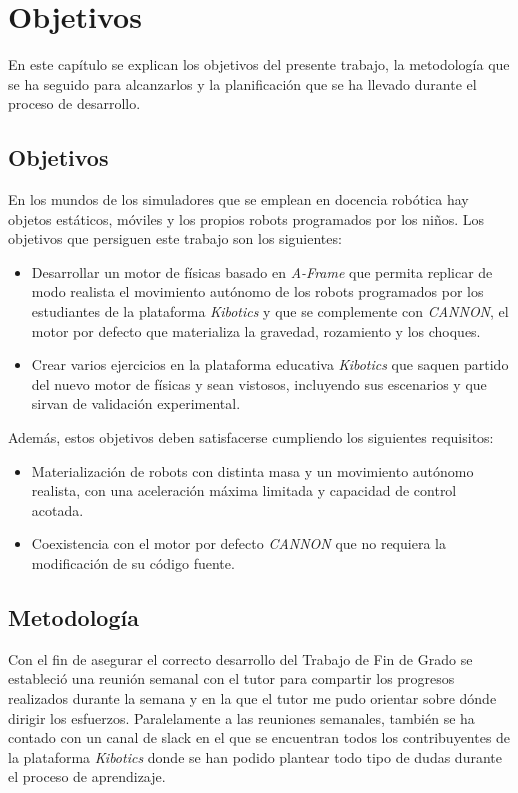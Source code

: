\chapter{Objetivos}
\label{chap:objetivos} 
En este capítulo se explican los objetivos del presente trabajo, la metodología que se ha seguido para alcanzarlos y la planificación que se ha llevado durante el proceso de desarrollo.
   
\section{Objetivos}
En los mundos de los simuladores que se emplean en docencia robótica hay objetos estáticos, móviles y los propios robots programados por los niños. Los objetivos que persiguen este trabajo son los siguientes:

\begin{itemize}
    \item Desarrollar un motor de físicas basado en \textit{A-Frame} que permita replicar de modo realista el movimiento autónomo de los robots programados por los estudiantes de la plataforma \textit{Kibotics} y que se complemente con \textit{CANNON}, el motor por defecto que materializa la gravedad, rozamiento y los choques.
    \item Crear varios ejercicios en la plataforma educativa \textit{Kibotics} que saquen partido del nuevo motor de físicas y sean vistosos, incluyendo sus escenarios y que sirvan de validación experimental.
\end{itemize}

Además, estos objetivos deben satisfacerse cumpliendo los siguientes requisitos:

\begin{itemize}
    \item Materialización de robots con distinta masa y un movimiento autónomo realista, con una aceleración máxima limitada y capacidad de control acotada.
    \item Coexistencia con el motor por defecto \textit{CANNON} que no requiera la modificación de su código fuente.
\end{itemize}

\section{Metodología}
Con el fin de asegurar el correcto desarrollo del Trabajo de Fin de Grado se estableció una reunión semanal con el tutor para compartir los progresos realizados durante la semana y en la que el tutor me pudo orientar sobre dónde dirigir los esfuerzos. Paralelamente a las reuniones semanales, también se ha contado con un canal de slack en el que se encuentran todos los contribuyentes de la plataforma \textit{Kibotics} donde se han podido plantear todo tipo de dudas durante el proceso de aprendizaje. \newline


